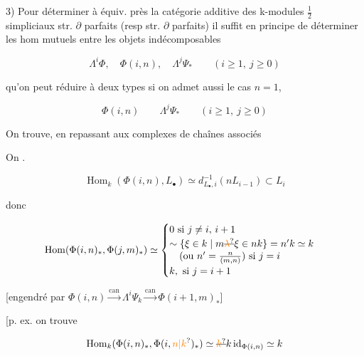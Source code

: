  3) Pour déterminer à équiv. près la catégorie additive des k-modules $\frac12$ simpliciaux str. $\partial$ parfaits (resp str. $\partial$ parfaits) il suffit en principe de déterminer les hom mutuels entre les objets indécomposables

\[
\Lambda^i\Phi,\quad \Phi(i,n),\quad\Lambda^j\Psi_{\ast}\qquad(i\geq1,\ j\geq0)
\]


qu'on peut réduire à deux types si on admet aussi le cas $n=1$,

\[
\Phi(i,n)\qquad\Lambda^j\Psi_{\ast}\qquad(i\geq1,\ j\geq0)
\]

On trouve, en repassant aux complexes de chaînes associés


On  .

\[
\operatorname{Hom}_k(\Phi(i,n),L_{\bullet})\simeq d_{L_{\bullet},i}^{-1}(nL_{i-1})\subset L_i
\]


donc 

\[
\operatorname{Hom}(\Phi(i,n)_{\ast},\Phi(j,m)_{\ast})\simeq
\begin{cases}
0\ \text{si } j\ne i,\,i+1\\
\sim\{\xi\in k\mid m\deleted{\unsure{\lambda}}\xi\in nk\}=n'k\simeq k\\[-2pt]
\quad(\text{ou } n'=\frac{n}{(m,n)})\ \text{si }j=i\\
k,\ \text{si }j=i+1
\end{cases}
\]

[engendré par  $\Phi(i,n)\xrightarrow{\mathrm{can}}\Lambda^i\Psi_k\xrightarrow{\mathrm{can}}\Phi(i+1,m)_{\ast}$]

[p. ex. on trouve

\[
\operatorname{Hom}_k(\Phi(i,n)_{\ast},\Phi(i,\unsure{n|k})_{\ast})\simeq\deleted{\unsure{k}}k\,\mathrm{id}_{\Phi(i,n)}\simeq k
\]

